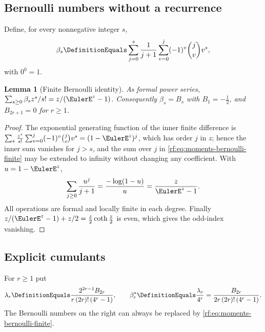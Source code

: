 \documentclass[11pt,oneside]{article}
\theoremstyle{plain}
\newtheorem{lemma}[theorem]{Lemma}
\theoremstyle{definition}
\theoremstyle{remark}
\begin{document}
\subsection{Bernoulli numbers without a recurrence}
\label{rf:sec:moments-bernoulli}

Define, for every nonnegative integer $s$,
\begin{equation}
 \beta_{s}\DefinitionEquals\sum_{j=0}^{s}\frac{1}{j+1}
  \sum_{v=0}^{j}(-1)^{v}\binom{j}{v}v^{s},
 \label{rf:eq:moments-bernoulli-finite}
\end{equation}
with $0^{0}=1$.

\begin{lemma}[Finite Bernoulli identity]
\label{rf:lem:moments-bernoulli}
As formal power series,
$\sum_{s\ge0}\beta_{s}z^{s}/s!=z/(\EulerE^{z}-1)$.  Consequently
$\beta_{s}=B_{s}$ with $B_{1}=-\tfrac12$, and $B_{2r+1}=0$ for $r\ge1$.
\end{lemma}

\begin{proof}
The exponential generating function of the inner finite difference is
$\sum_{s}\frac{z^{s}}{s!}\sum_{v=0}^{j}(-1)^{v}\binom{j}{v}v^{s}=(1-\EulerE^{z})^{j}$,
which has order $j$ in $z$; hence the inner sum vanishes for $j>s$, and the
sum over $j$ in \cref{rf:eq:moments-bernoulli-finite} may be extended to
infinity without changing any coefficient.  With $u=1-\EulerE^{z}$,
\[
 \sum_{j\ge0}\frac{u^{j}}{j+1}=\frac{-\log(1-u)}{u}=\frac{z}{\EulerE^{z}-1}.
\]
All operations are formal and locally finite in each degree.  Finally
$z/(\EulerE^{z}-1)+z/2=\tfrac{z}{2}\coth\tfrac{z}{2}$ is even, which gives
the odd-index vanishing.
\end{proof}

\subsection{Explicit cumulants}
\label{rf:sec:moments-cumulants}

For $r\ge1$ put
\begin{equation}
 \lambda_{r}\DefinitionEquals\frac{2^{2r-1}B_{2r}}{r\,(2r)!\,(4^{r}-1)},\qquad
 \beta^{\ast}_{r}\DefinitionEquals\frac{\lambda_{r}}{4^{r}}
 =\frac{B_{2r}}{2r\,(2r)!\,(4^{r}-1)}.
 \label{rf:eq:moments-lambda}
\end{equation}
The Bernoulli numbers on the right can always be replaced by
\cref{rf:eq:moments-bernoulli-finite}.
\end{document}
